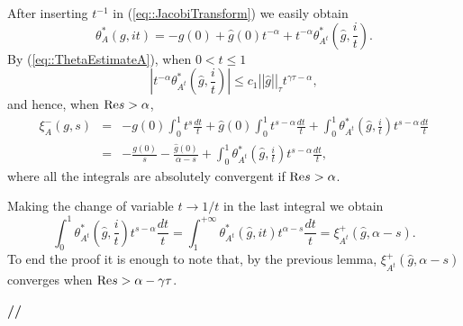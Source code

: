 \documentclass[12pt,a4paper]{amsart}
\begin{document}
{{\removelastskip\par\medskip\goodbreak{}}
After inserting ${t}^{-1}$ in (\ref{eq::JacobiTransform})
we easily obtain
\begin{equation}\nonumber
{{\theta}_{{A}}^*\left({{g}},{i{t}}\right)}=
-{g}(0)+\hat{g}(0){t}^{-{\alpha}}+
{t}^{-{\alpha}}
{{\theta}_{{{\left.{{A}}\right.}^t}}^*\left({\hat{g}},{\frac{i}{t}}\right)}.
\end{equation}
By (\ref{eq::ThetaEstimateA}), when $0<{t}\leq1$
\begin{equation}\nonumber
{\left|{
	{t}^{-{\alpha}}
	{{\theta}_{{{\left.{{A}}\right.}^t}}^*\left({\hat{g}},{\frac{i}{t}}\right)}
}\right|} \leq
{c}_1{{\left|\!\left|{\hat{g}}\right|\!\right|}_{{\tau}}}
	{t}^{{\gamma}{\tau}-{\alpha}},
\end{equation}
and hence, when ${\mathop{\rm Re}\nolimits}{s}>{\alpha}$,
\begin{eqnarray}
{{\xi}_{A}^-\left({g},{s}\right)}&=&
-{g}(0)\int_0^1
	{t}^{s}\frac{d{t}}{t}
+\hat{g}(0)\int_0^1
	{t}^{{s}-{\alpha}}\frac{d{t}}{t}
+\int_0^1{{\theta}_{{{\left.{{A}}\right.}^t}}^*\left({\hat{g}},{\frac{i}{t}}\right)}
	{t}^{{s}-{\alpha}}\frac{d{t}}{t}
\nonumber\\
	&=&
	-\frac{{g}(0)}{s}
	-\frac{\hat{g}(0)}{{\alpha}-{s}}
+\int_0^1{{\theta}_{{{\left.{{A}}\right.}^t}}^*\left({\hat{g}},{\frac{i}{t}}\right)}
	{t}^{{s}-{\alpha}}\frac{d{t}}{t},
\nonumber
\end{eqnarray}
where all the integrals are absolutely convergent
if ${\mathop{\rm Re}\nolimits}{s}>{\alpha}$.

Making the change of variable ${t}\to1/{t}$
in the last integral we obtain
\begin{equation}\nonumber
\int_0^1{{\theta}_{{{\left.{{A}}\right.}^t}}^*\left({\hat{g}},{\frac{i}{t}}\right)}
	{t}^{{s}-{\alpha}}\frac{d{t}}{t}=
\int_1^{+\infty}{{\theta}_{{{\left.{{A}}\right.}^t}}^*\left({\hat{g}},{i{t}}\right)}
	{t}^{{\alpha}-{s}}\frac{d{t}}{t}
={{\xi}_{{{\left.{{A}}\right.}^t}}^+\left({\hat{g}},{{\alpha}-{s}}\right)}.
\end{equation}
To end the proof it is enough to note that, by the previous lemma,
${{\xi}_{{{\left.{{A}}\right.}^t}}^+\left({\hat{g}},{{\alpha}-{s}}\right)}$
converges when
${\mathop{\rm Re}\nolimits}{s}>{\alpha}-{\gamma}{\tau}$.
{{\bf //}\par\smallskip}

}
\end{document}
